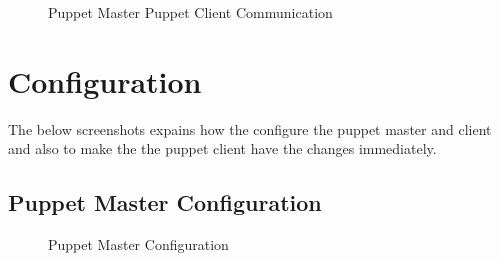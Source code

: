 \documentclass[9pt,twocolumn,twoside]{../../styles/osajnl}
\begin{document}
\begin{figure}[htbp]
\centering
{}
\caption{Puppet Master Puppet Client Communication}
\label{fig:Puppet}
\end{figure}


\section{Configuration}

The below screenshots expains how the configure the puppet master and
client and also to make the the puppet client have the changes
immediately. 

\subsection {Puppet Master Configuration}

\begin{figure}[htbp]
\centering
{}
\caption{Puppet Master Configuration}
\label{fig:Puppet}
\end{figure} \cite{www-techarena}
\end{document}
